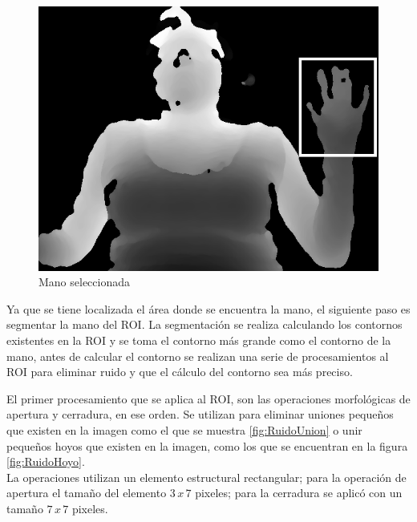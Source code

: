 \begin{figure}[h!]
\begin{center}
\includegraphics[scale=.5]{./Figures/roi.png}
\end{center}
\caption{Mano seleccionada}
\label{fig:Roi}
\end{figure}  

Ya que se tiene localizada el área donde se encuentra la mano, el siguiente paso es segmentar la mano del ROI. La segmentación se realiza calculando los contornos existentes en la ROI y se toma el contorno más grande como el contorno de la mano, antes de calcular el contorno se realizan una serie de procesamientos al ROI para eliminar ruido y que el cálculo del contorno sea más preciso.    

El primer procesamiento que se aplica al ROI, son las operaciones morfológicas de apertura y cerradura, en ese orden. Se utilizan para eliminar uniones pequeños que existen en la imagen como el que se muestra \ref{fig:RuidoUnion} o unir pequeños hoyos que existen en la imagen, como los que se encuentran en la figura \ref{fig:RuidoHoyo}.\\
La operaciones utilizan un elemento estructural rectangular; para la operación de apertura el tamaño del elemento $3 \, x \, 7$ pixeles; para la cerradura se aplic\'o con un tamaño  $7 \, x \, 7$ pixeles. 

